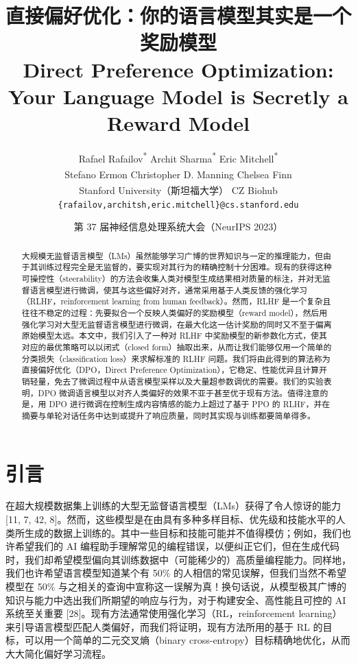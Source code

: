 \documentclass[11pt,UTF8,fontset=fandol]{ctexart}
\title{\textbf{直接偏好优化：你的语言模型其实是一个奖励模型}\\[0.3em]
\large Direct Preference Optimization: Your Language Model is Secretly a Reward Model}
\author{%
Rafael Rafailov\textsuperscript{*\dag}\quad
Archit Sharma\textsuperscript{*\dag}\quad
Eric Mitchell\textsuperscript{*\dag}\\[0.3em]
Stefano Ermon\textsuperscript{\dag\ddag}\quad
Christopher D. Manning\textsuperscript{\dag}\quad
Chelsea Finn\textsuperscript{\dag}\\[0.4em]
\textsuperscript{\dag} Stanford University（斯坦福大学）\quad
\textsuperscript{\ddag} CZ Biohub\\[0.2em]
\texttt{\{rafailov,architsh,eric.mitchell\}@cs.stanford.edu}}
\date{第 37 届神经信息处理系统大会（NeurIPS 2023）}
\begin{document}
\maketitle


\begin{abstract}
大规模无监督语言模型（LMs）虽然能够学习广博的世界知识与一定的推理能力，但由于其训练过程完全是无监督的，要实现对其行为的精确控制十分困难。现有的获得这种可操控性（steerability）的方法会收集人类对模型生成结果相对质量的标注，并对无监督语言模型进行微调，使其与这些偏好对齐，通常采用基于人类反馈的强化学习（RLHF，reinforcement learning from human feedback）。然而，RLHF 是一个复杂且往往不稳定的过程：先要拟合一个反映人类偏好的奖励模型（reward model），然后用强化学习对大型无监督语言模型进行微调，在最大化这一估计奖励的同时又不至于偏离原始模型太远。本文中，我们引入了一种对 RLHF 中奖励模型的新参数化方式，使其对应的最优策略可以以闭式（closed form）抽取出来，从而让我们能够仅用一个简单的分类损失（classification loss）来求解标准的 RLHF 问题。我们将由此得到的算法称为直接偏好优化（DPO，Direct Preference Optimization），它稳定、性能优异且计算开销轻量，免去了微调过程中从语言模型采样以及大量超参数调优的需要。我们的实验表明，DPO 微调语言模型以对齐人类偏好的效果不亚于甚至优于现有方法。值得注意的是，用 DPO 进行微调在控制生成内容情感的能力上超过了基于 PPO 的 RLHF，并在摘要与单轮对话任务中达到或提升了响应质量，同时其实现与训练都要简单得多。
\end{abstract}

\section{引言}

在超大规模数据集上训练的大型无监督语言模型（LMs）获得了令人惊讶的能力 [11, 7, 42, 8]。然而，这些模型是在由具有多种多样目标、优先级和技能水平的人类所生成的数据上训练的。其中一些目标和技能可能并不值得模仿；例如，我们也许希望我们的 AI 编程助手理解常见的编程错误，以便纠正它们，但在生成代码时，我们却希望模型偏向其训练数据中（可能稀少的）高质量编程能力。同样地，我们也许希望语言模型知道某个有 50\% 的人相信的常见误解，但我们当然不希望模型在 50\% 与之相关的查询中宣称这一误解为真！换句话说，从模型极其广博的知识与能力中选出我们所期望的响应与行为，对于构建安全、高性能且可控的 AI 系统至关重要 [28]。现有方法通常使用强化学习（RL，reinforcement learning）来引导语言模型匹配人类偏好，而我们将证明，现有方法所用的基于 RL 的目标，可以用一个简单的二元交叉熵（binary cross-entropy）目标精确地优化，从而大大简化偏好学习流程。
\end{document}
